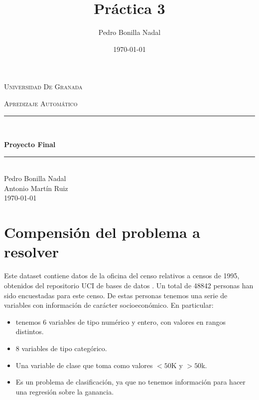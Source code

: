 \documentclass[11pt,a4paper]{article}
\title{Práctica 3}
\author{Pedro Bonilla Nadal}
\date{\today}
\begin{document}
\begin{titlepage}
\begin{center}

\vspace*{.06\textheight}
{\scshape\LARGE Universidad De Granada\par}\vspace{1.5cm} %
\textsc{\Large Apredizaje Automático}\\[0.5cm] %

\rule{\textwidth}{0.4mm} \\[0.4cm] %
{\huge \bfseries Proyecto Final\par}\vspace{0.4cm} %

\rule{\textwidth}{0.4mm} \\[11.5cm] %
 {\Large Pedro Bonilla Nadal\\Antonio Martín Ruiz}\\[1cm]

 {\today}

\vfill
\end{center}
\end{titlepage}

\setcounter{tocdepth}{2}
\tableofcontents
\newpage



\section{Compensión del problema a resolver }

Este dataset contiene datos de la oficina del censo\cite{census} relativos a censos de 1995, obtenidos del repositorio UCI de bases de datos \cite{uci}. Un total de 48842 personas han sido encuestadas para este censo. De estas personas tenemos una serie de variables con información de carácter socioeconómico. En particular:
\begin{itemize}
\item tenemos 6 variables de tipo numérico y entero, con valores en rangos distintos.
\item 8 variables de tipo categórico.
\item Una variable de clase que toma como valores $<50$K y $>50$k.
\item Es un problema de clasificación, ya que no tenemos información para hacer una regresión sobre la ganancia.
\end{itemize}
\end{document}
